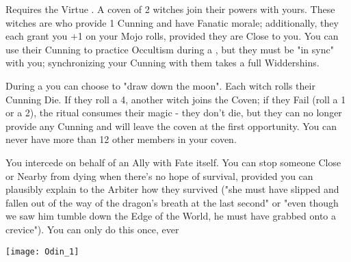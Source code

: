 {\begin{multicols*}{2}
{    \item {}  Requires the Virtue .  A coven of 2 witches join their powers with yours.  These witches are  who provide 1 Cunning and have Fanatic morale; additionally, they each grant you +1 on your Mojo rolls, provided they are Close to you. You can use their Cunning to practice Occultism during a , but they must be "in sync" with you; synchronizing your Cunning with them takes a full Widdershins. 

During a  you can choose to "draw down the moon".  Each witch rolls their Cunning Die.  If they roll a 4, another witch joins the Coven; if they Fail (roll a 1 or a 2), the ritual consumes their magic - they don't die, but they can no longer provide any Cunning and will leave the coven at the first opportunity.  You can never have more than 12 other members in your coven.  

    \item  {}  You intercede on behalf of an Ally with Fate itself.  You can stop someone Close or Nearby from dying when there's no hope of survival, provided you can plausibly explain to the Arbiter how they survived ("she must have slipped and fallen out of the way of the dragon's breath at the last second" or "even though we saw him tumble down the Edge of the World, he must have grabbed onto a crevice").  You can only do this once, ever 
  }

\begin{center}
  \texttt{[image: Odin\_1]}
\end{center}



  \cbreak




\end{multicols*}}

